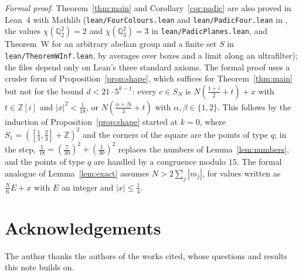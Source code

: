 \documentclass[11pt,a4paper]{amsart}
\theoremstyle{remark}
\newcommand{\Q}{\mathbb{Q}}
\newcommand{\Z}{\mathbb{Z}}
\begin{document}
\emph{Formal proof.} Theorem~\ref{thm:main} and Corollary~\ref{cor:padic} are also proved in Lean~4 with Mathlib
(\nolinkurl{lean/FourColours.lean} and \nolinkurl{lean/PadicFour.lean} in \cite{Repo}, the values
$\chi(\Q_2^2)=2$ and $\chi(\Q_3^2)=3$ in \nolinkurl{lean/PadicPlanes.lean}, and Theorem~W for an arbitrary abelian
group and a finite set $S$ in \nolinkurl{lean/TheoremWInf.lean}, by averages over boxes and a limit along an
ultrafilter); the files depend only on Lean's three standard axioms. The formal proof uses a cruder form of
Proposition~\ref{prop:shape}, which suffices for Theorem~\ref{thm:main} but not for the bound
$d<21\cdot5^{k-1}$: every $c\in S_N$ is $N(\frac{1+i}2+t)+x$ with $t\in\Z[i]$ and $|x|^2<\frac1{18}$, or
$N(\frac{\alpha+\beta i}3+t)$ with $\alpha,\beta\in\{1,2\}$. This follows by the induction of
Proposition~\ref{prop:shape} started at $k=0$, where $S_1=([\frac13,\frac23]+\Z)^2$ and the corners of the square are
the points of type $q$; in the step, $\frac1{18}=(\frac7{30})^2+(\frac1{30})^2$ replaces the numbers of
Lemma~\ref{lem:numbers}, and the points of type $q$ are handled by a congruence modulo $15$. The formal analogue of Lemma~\ref{lem:exact}
assumes $N>2\sum_j|m_j|$, for values written as $\frac N6E+x$ with $E$ an integer and $|x|\le\frac14$.

\section*{Acknowledgements}
The author thanks the authors of the works cited, whose questions and results this note builds on.
\end{document}
